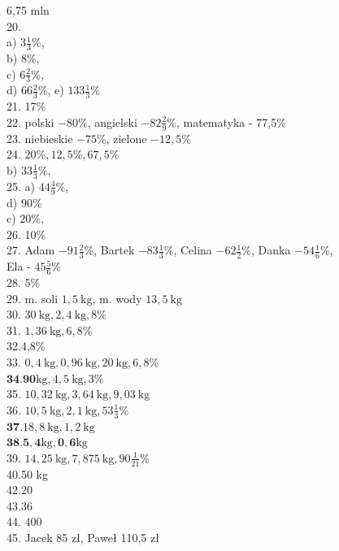 \documentclass[10pt]{article}
\begin{document}
6,75 mln\\
20.\\
a) \(3 \frac{1}{3} \%\),\\
b) \(8 \%\),\\
c) \(6 \frac{2}{3} \%\),\\
d) \(66 \frac{2}{3} \%\), e) \(133 \frac{1}{3} \%\)\\
21. 17\%\\
22. polski \(-80 \%\), angielski \(-82 \frac{2}{9} \%\), matematyka - 77,5\%\\
23. niebieskie \(-75 \%\), zielone \(-12,5 \%\)\\
24. \(20 \%, 12,5 \%, 67,5 \%\)\\
b) \(33 \frac{1}{3} \%\),\\
25. a) \(44 \frac{4}{9} \%\),\\
d) \(90 \%\)\\
c) \(20 \%\),\\
26. 10\%\\
27. Adam \(-91 \frac{2}{3} \%\), Bartek \(-83 \frac{1}{3} \%\), Celina \(-62 \frac{1}{2} \%\), Danka \(-54 \frac{1}{6} \%\),\\
Ela - \(45 \frac{5}{6} \%\)\\
28. 5\%\\
29. m. soli \(1,5 \mathrm{~kg}\), m. wody \(13,5 \mathrm{~kg}\)\\
30. \(30 \mathrm{~kg}, 2,4 \mathrm{~kg}, 8 \%\)\\
31. \(1,36 \mathrm{~kg}, 6,8 \%\)\\
32.4,8\%\\
33. \(0,4 \mathrm{~kg}, 0,96 \mathrm{~kg}, 20 \mathrm{~kg}, 6,8 \%\)\\
\(\mathbf{3 4 . 9 0} \mathrm{kg}, 4,5 \mathrm{~kg}, 3 \%\)\\
35. \(10,32 \mathrm{~kg}, 3,64 \mathrm{~kg}, 9,03 \mathrm{~kg}\)\\
36. \(10,5 \mathrm{~kg}, 2,1 \mathrm{~kg}, 53 \frac{1}{3} \%\)\\
\(\mathbf{3 7 .} 18,8 \mathrm{~kg}, 1,2 \mathrm{~kg}\)\\
\(\mathbf{3 8 . 5 , 4 \mathrm { kg } , 0 , 6 \mathrm { kg }}\)\\
39. \(14,25 \mathrm{~kg}, 7,875 \mathrm{~kg}, 90 \frac{1}{21} \%\)\\
40.50 kg\\
42.20\\
43.36\\
44. 400\\
45. Jacek 85 zł, Paweł 110,5 zł\\
\end{document}
